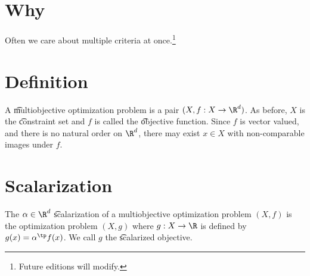

\section*{Why}

Often we care about multiple criteria at once.\footnote{Future editions will modify.}

\section*{Definition}

A \t{multiobjective optimization problem} is a pair $(X, f: X \to \R ^d)$.
As before, $X$ is the \t{constraint set} and $f$ is called the \t{objective function}.
Since $f$ is vector valued, and there is no natural order on $\R ^d$, there may exist $x \in X$ with non-comparable images under $f$.

\section*{Scalarization}

The $\alpha  \in \R ^d$ \t{scalarization} of a multiobjective optimization problem $(X, f)$ is the optimization problem $(X, g)$ where $g: X \to \R $ is defined by $g(x) = \alpha ^\tp f(x)$.
We call $g$ the \t{scalarized objective}.

\blankpage